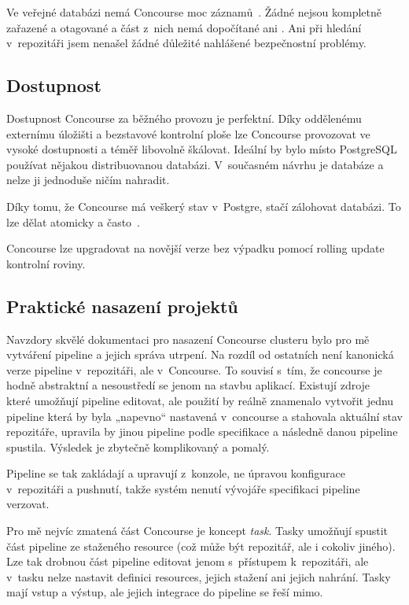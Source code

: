         Ve veřejné databázi  nemá Concourse moc záznamů~\cite{cve-concourse}. Žádné nejsou kompletně zařazené a otagované a část z~nich nemá dopočítané ani . Ani při hledání v~repozitáři jsem nenašel žádné důležité nahlášené bezpečnostní problémy.

    \subsection{Dostupnost}
        Dostupnost Concourse za běžného provozu je perfektní. Díky oddělenému externímu úložišti a bezstavové kontrolní ploše lze Concourse provozovat ve vysoké dostupnosti a téměř libovolně škálovat. Ideální by bylo místo PostgreSQL používat nějakou distribuovanou  databázi. V~současném návrhu je databáze  a nelze ji jednoduše ničím nahradit.

        Díky tomu, že Concourse má veškerý stav v~Postgre, stačí zálohovat databázi. To lze dělat atomicky a často~\cite{pg-backup}.

        Concourse lze upgradovat na novější verze bez výpadku pomocí rolling update kontrolní roviny.

    \subsection{Praktické nasazení projektů}
        Navzdory skvělé dokumentaci pro nasazení Concourse clusteru bylo pro mě vytváření pipeline a jejich správa utrpení. Na rozdíl od ostatních \CI není kanonická verze pipeline v~repozitáři, ale v~Concourse. To souvisí s~tím, že concourse je hodně abstraktní a nesoustředí se jenom na stavbu aplikací. Existují zdroje~\cite{concourse-pipeline-res} které umožňují pipeline editovat, ale použití by reálně znamenalo vytvořit jednu pipeline která by byla „napevno“ nastavená v~concourse a stahovala aktuální stav repozitáře, upravila by jinou pipeline podle specifikace a následně danou pipeline spustila. Výsledek je zbytečně komplikovaný a pomalý.

        Pipeline se tak zakládají a upravují z~konzole, ne úpravou konfigurace v~repozitáři a pushnutí, takže systém nenutí vývojáře specifikaci pipeline verzovat.

        Pro mě nejvíc zmatená část Concourse je koncept \textit{task}. Tasky umožňují spustit část pipeline ze staženého resource (což může být repozitář, ale i cokoliv jiného). Lze tak drobnou část pipeline editovat jenom s~přístupem k~repozitáři, ale v~tasku nelze nastavit definici resources, jejich stažení ani jejich nahrání. Tasky mají vstup a výstup, ale jejich integrace do pipeline se řeší mimo.

